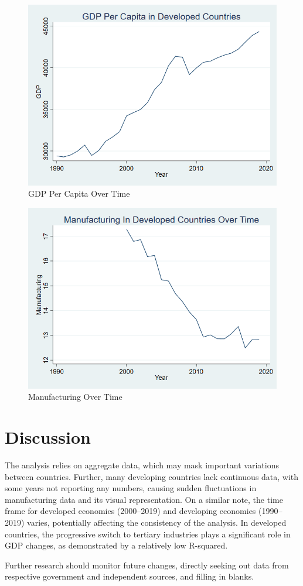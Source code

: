 \documentclass[12pt]{article}
\begin{document}
\begin{figure}
    \centering
    \includegraphics[width=0.5\linewidth]{FINAL FINAL GDP DEVELOPED.png}
    \caption{GDP Per Capita Over Time}
    \label{fig:enter-label}
\end{figure}
\begin{figure}
    \centering
    \includegraphics[width=0.5\linewidth]{FINAL FINAL MANU DEVELOPED.png}
    \caption{Manufacturing Over Time}
    \label{fig:enter-label}
\end{figure}


\section{Discussion}
\label{sec:discussion}


The analysis relies on aggregate data, which may mask important variations between countries. Further, many developing countries lack continuous data, with some years not reporting any numbers, causing sudden fluctuations in manufacturing data and its visual representation. On a similar note, the time frame for developed economies (2000–2019) and developing economies (1990–2019) varies, potentially affecting the consistency of the analysis.
In developed countries, the progressive switch to tertiary industries plays a significant role in GDP changes, as demonstrated by a relatively low R-squared.

Further research should monitor future changes, directly seeking out data from respective government and independent sources, and filling in blanks.
\end{document}
